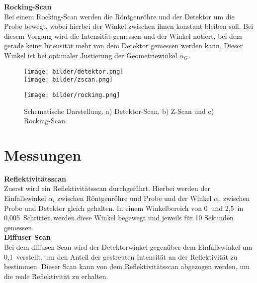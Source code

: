 \textbf{Rocking-Scan}\\
Bei einem Rocking-Scan werden die Röntgenröhre und der Detektor um die Probe bewegt, wobei hierbei der Winkel zwischen ihnen konstant bleiben soll. Bei diesem Vorgang wird die Intensität gemessen und der Winkel notiert, bei dem gerade keine Intensität mehr von dem Detektor gemessen werden kann. Dieser Winkel ist bei optimaler Justierung der Geometriewinkel $\alpha_G$.
\begin{figure}[]
\begin{minipage}[c]{0.45\textwidth}
\texttt{[image: bilder/detektor.png]}\\
\texttt{[image: bilder/zscan.png]}
\end{minipage}
\begin{minipage}[c]{0.45\textwidth}
\texttt{[image: bilder/rocking.png]}
\end{minipage}
\caption{Schematische Darstellung. a) Detektor-Scan, b) Z-Scan und c) Rocking-Scan\cite{anleitung}.}
\end{figure}

\section{Messungen}
\textbf{Reflektivitätsscan}\\
Zuerst wird ein Reflektivitätsscan durchgeführt. Hierbei werden der Einfallswinkel $\alpha_i$ zwischen Röntgenröhre und Probe und der Winkel $\alpha_r$ zwischen Probe und Detektor gleich gehalten. In einem Winkelbereich von 0\textdegree\, und 2,5\textdegree\, in 0,005\textdegree\, Schritten werden diese Winkel begewegt und jeweils für 10 Sekunden gemessen.\\

\textbf{Diffuser Scan}\\
Bei dem diffusen Scan wird der Detektorwinkel gegenüber dem Einfallswinkel um 0,1\textdegree\, verstellt, um den Anteil der gestreuten Intensität an der Reflektivität zu bestimmen. Dieser Scan kann von dem Reflektivitätsscan abgezogen werden, um die reale Reflektivität zu erhalten.
